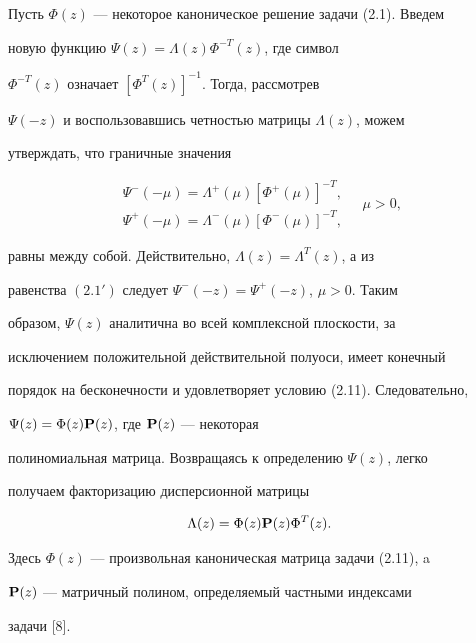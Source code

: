  


\begin{pf} 


Пусть $\Phi(z)$ --- некоторое каноническое решение задачи (2.1). Введем 


новую функцию $\Psi(z)=\Lambda(z)\Phi^{-T}(z)$, где символ 


$\Phi^{-T}(z)$ означает $[\Phi^T(z)]^{-1}$. Тогда, рассмотрев 


$\Psi(-z)$ и воспользовавшись четностью матрицы $\Lambda(z)$, можем 


утверждать, что граничные значения 


$$ 


\begin{array}{c} 


\Psi^-(-\mu)=\Lambda^+(\mu)[\Phi^+(\mu)]^{-T},\\[2mm] 


\Psi^+(-\mu)=\Lambda^-(\mu)[\Phi^-(\mu)]^{-T}, 


\end{array} 


\quad \mu>0, 


$$ 


равны между собой. Действительно, $\Lambda(z)=\Lambda^T(z)$, а из 


равенства $(2.1')$ следует $\Psi^-(-z)=\Psi^+(-z)$, $\mu>0$. Таким 


образом, $\Psi(z)$ аналитична во всей комплексной плоскости, за 


исключением положительной действительной полуоси, имеет конечный 


порядок на бесконечности и удовлетворяет условию (2.11). Следовательно, 


$\Psi(z)=\Phi(z)\bold P(z)$, где $\bold P(z)$ --- некоторая 


полиномиальная матрица. Возвращаясь к определению $\Psi(z)$, легко 


получаем факторизацию дисперсионной матрицы 


\begin{equation} 


\Lambda(z)=\Phi(z)\bold P(z)\Phi^T(z). 


\end{equation} 


Здесь $\Phi(z)$ --- произвольная каноническая матрица задачи (2.11), a 


$\bold P(z)$ --- матричный полином, определяемый частными индексами 


задачи [8]. 



\end{pf}
